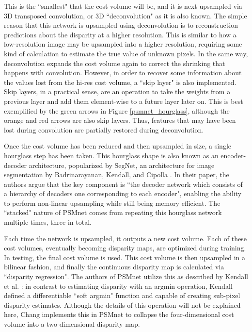 This is the ``smallest" that the cost volume will be, and it is next upsampled via 3D transposed convolution, or 3D ``deconvolution" as it is also known. The simple reason that this network is upsampled using deconvolution is to reconstruction predictions about the disparity at a higher resolution. This is similar to how a low-resolution image may be upsampled into a higher resolution, requiring some kind of calculation to estimate the true value of unknown pixels. In the same way, deconvolution expands the cost volume again to correct the shrinking that happens with convolution. However, in order to recover some information about the values lost from the hi-res cost volume, a ``skip layer" is also implemented. Skip layers, in a practical sense, are an operation to take the weights from a previous layer and add them element-wise to a future layer later on. This is best exemplified by the green arrows in Figure \ref{psmnet_hourglass}, although the orange and red arrows are also skip layers. Thus, features that may have been lost during convolution are partially restored during deconvolution. 

Once the cost volume has been reduced and then upsampled in size, a single hourglass step has been taken. This hourglass shape is also known as an encoder-decoder architecture, popularized by SegNet, an architecture for image segmentation by Badrinarayanan, Kendall, and Cipolla  \cite{badrinarayanan_segnet:_2017}. In their paper, the authors argue that the key component is ``the decoder network which consists of a hierarchy of decoders one corresponding to each encoder", enabling the ability to perform non-linear upsampling while still being memory efficient. The ``stacked" nature of PSMnet comes from repeating this hourglass network multiple times, three in total. 

Each time the network is upsampled, it outputs a new cost volume. Each of these cost volumes, eventually becoming disparity maps, are optimized during training. In testing, the final cost volume is used. This cost volume is then upsampled in a bilinear fashion, and finally the continuous disparity map is calculated via ``disparity regression". The authors of PSMnet utilize this as described by Kendall et al. \cite{kendall_end--end_2017}: in contrast to estimating disparity with an argmin operation, Kendall defined a differentiable ``soft argmin" function and capable of creating sub-pixel disparity estimates. Although the details of this operation will not be explained here, Chang implements this in PSMnet to collapse the four-dimensional cost volume into a two-dimensional disparity map. 

